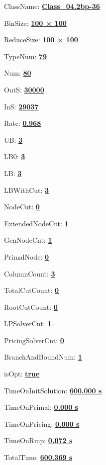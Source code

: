 \documentclass[11pt]{article}
\begin{document}
\pagestyle{empty}


ClassName: \underline{\textbf{Class_04.2bp-36}}
\par
BinSize: \underline{\textbf{100 × 100}}
\par
ReduceSize: \underline{\textbf{100 × 100}}
\par
TypeNum: \underline{\textbf{79}}
\par
Num: \underline{\textbf{80}}
\par
OutS: \underline{\textbf{30000}}
\par
InS: \underline{\textbf{29037}}
\par
Rate: \underline{\textbf{0.968}}
\par
UB: \underline{\textbf{3}}
\par
LB0: \underline{\textbf{3}}
\par
LB: \underline{\textbf{3}}
\par
LBWithCut: \underline{\textbf{3}}
\par
NodeCut: \underline{\textbf{0}}
\par
ExtendedNodeCnt: \underline{\textbf{1}}
\par
GenNodeCnt: \underline{\textbf{1}}
\par
PrimalNode: \underline{\textbf{0}}
\par
ColumnCount: \underline{\textbf{3}}
\par
TotalCutCount: \underline{\textbf{0}}
\par
RootCutCount: \underline{\textbf{0}}
\par
LPSolverCnt: \underline{\textbf{1}}
\par
PricingSolverCnt: \underline{\textbf{0}}
\par
BranchAndBoundNum: \underline{\textbf{1}}
\par
isOpt: \underline{\textbf{true}}
\par
TimeOnInitSolution: \underline{\textbf{600.000 s}}
\par
TimeOnPrimal: \underline{\textbf{0.000 s}}
\par
TimeOnPricing: \underline{\textbf{0.000 s}}
\par
TimeOnRmp: \underline{\textbf{0.072 s}}
\par
TotalTime: \underline{\textbf{600.369 s}}
\par
\newpage
\end{document}
